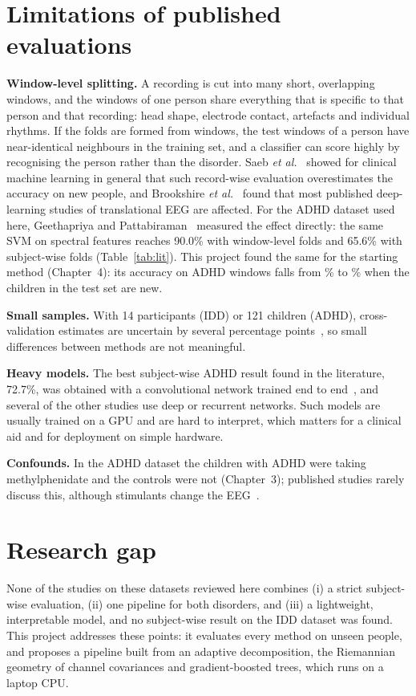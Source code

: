 \section{Limitations of published evaluations}
\label{sec:leakage}
\textbf{Window-level splitting.} A recording is cut into many short, overlapping windows, and
the windows of one person share everything that is specific to that person and that recording:
head shape, electrode contact, artefacts and individual rhythms. If the folds are formed from
windows, the test windows of a person have near-identical neighbours in the training set, and a
classifier can score highly by recognising the person rather than the disorder. Saeb
\emph{et al.}~\cite{saeb2017} showed for clinical machine learning in general that such
record-wise evaluation overestimates the accuracy on new people, and Brookshire
\emph{et al.}~\cite{brookshire2024} found that most published deep-learning studies of
translational EEG are affected. For the ADHD dataset used here, Geethapriya and
Pattabiraman~\cite{geethapriya2026} measured the effect directly: the same SVM on spectral
features reaches 90.0\% with window-level folds and 65.6\% with subject-wise folds
(Table~\ref{tab:lit}). This project found the same for the starting method (Chapter~4): its
accuracy on ADHD windows falls from \% to \% when the
children in the test set are new.

\textbf{Small samples.} With 14 participants (IDD) or 121 children (ADHD), cross-validation
estimates are uncertain by several percentage points~\cite{varoquaux2018}, so small differences
between methods are not meaningful.

\textbf{Heavy models.} The best subject-wise ADHD result found in the literature, 72.7\%, was
obtained with a convolutional network trained end to end~\cite{geethapriya2026}, and several of
the other studies use deep or recurrent networks. Such models are usually trained on a GPU and
are hard to interpret, which matters for a clinical aid and for deployment on simple hardware.

\textbf{Confounds.} In the ADHD dataset the children with ADHD were taking methylphenidate and
the controls were not (Chapter~3); published studies rarely discuss this, although stimulants
change the EEG~\cite{clarke2002}.

\section{Research gap}
None of the studies on these datasets reviewed here combines (i) a strict subject-wise
evaluation, (ii) one pipeline for both disorders, and (iii) a lightweight, interpretable model, and no subject-wise result on the IDD dataset was found. This project addresses
these points: it evaluates every method on unseen people, and proposes a pipeline built from
an adaptive decomposition, the Riemannian geometry of channel covariances and gradient-boosted
trees, which runs on a laptop CPU.
